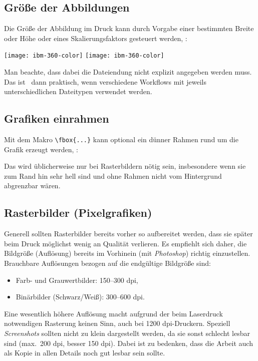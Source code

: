\subsection{Größe der Abbildungen}

Die Größe der Abbildung im Druck kann durch Vorgabe einer bestimmten Breite
oder Höhe oder eines Skalierungsfaktors gesteuert werden, {\zB}:
%
\begin{GenericCode}[numbers=none]
\texttt{[image: ibm-360-color]}
\texttt{[image: ibm-360-color]}
\end{GenericCode}
%
Man beachte, dass dabei die Dateiendung nicht explizit angegeben werden muss.
Das ist \va\ dann praktisch, wenn verschiedene Workflows mit jeweils
unterschiedlichen Dateitypen verwendet werden.


\subsection{Grafiken einrahmen}

Mit dem Makro \verb!\fbox{...}! kann optional ein dünner Rahmen rund um die
Grafik erzeugt werden, \zB:
%
\begin{GenericCode}[numbers=none]
\end{GenericCode}
%
Das wird üblicherweise nur bei Rasterbildern nötig sein, insbesondere wenn
sie zum Rand hin sehr hell sind und ohne Rahmen nicht vom Hintergrund
abgrenzbar wären.

\subsection{Rasterbilder (Pixelgrafiken)}

Generell sollten Rasterbilder bereits vorher so aufbereitet werden, dass sie später
beim Druck möglichst wenig an Qualität verlieren. Es empfiehlt sich daher,
die Bildgröße (Auflösung) bereits im Vorhinein (\zB mit \emph{Photoshop})
richtig einzustellen.
Brauchbare Auflösungen bezogen auf die endgültige Bildgröße sind:
%
\begin{itemize}
  \item Farb- und Grauwertbilder: 150--300 dpi,
  \item Binärbilder (Schwarz/Weiß): 300--600 dpi.
\end{itemize}
%
Eine wesentlich höhere Auflösung macht aufgrund der beim Laserdruck
notwendigen Rasterung keinen Sinn, auch bei 1200 dpi-Druckern. Speziell
\emph{Screen\-shots} sollten nicht zu klein dargestellt werden, da sie sonst
schlecht lesbar sind (max.\ 200 dpi, besser 150 dpi). Dabei ist zu bedenken,
dass die Arbeit auch als Kopie in allen Details noch gut lesbar sein sollte.

